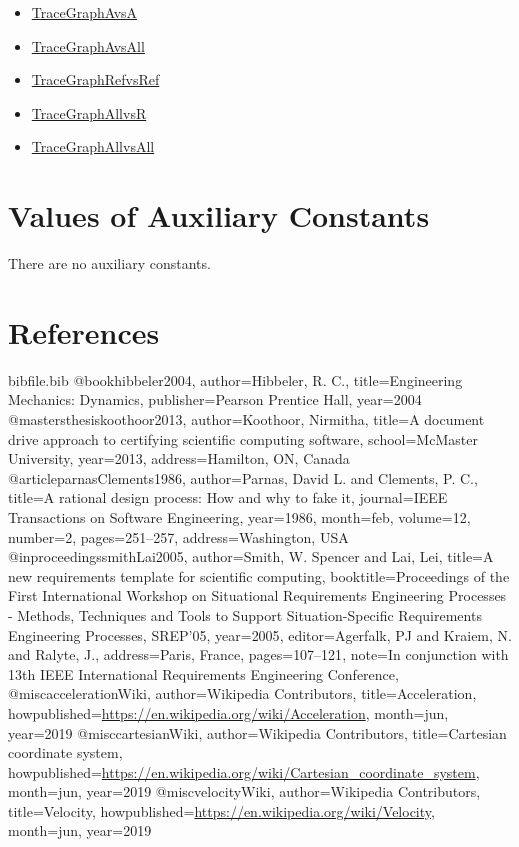 \documentclass[12pt]{article}
\begin{document}
\begin{itemize}
\item{\hyperref{../../../traceygraphs/SglPendulum/avsa.svg}{}{}{TraceGraphAvsA}}
\item{\hyperref{../../../traceygraphs/SglPendulum/avsall.svg}{}{}{TraceGraphAvsAll}}
\item{\hyperref{../../../traceygraphs/SglPendulum/refvsref.svg}{}{}{TraceGraphRefvsRef}}
\item{\hyperref{../../../traceygraphs/SglPendulum/allvsr.svg}{}{}{TraceGraphAllvsR}}
\item{\hyperref{../../../traceygraphs/SglPendulum/allvsall.svg}{}{}{TraceGraphAllvsAll}}
\end{itemize}
\section{Values of Auxiliary Constants}
\label{Sec:AuxConstants}
There are no auxiliary constants.

\section{References}
\label{Sec:References}
\begin{filecontents*}{bibfile.bib}
@book{hibbeler2004,
author={Hibbeler, R. C.},
title={Engineering Mechanics: Dynamics},
publisher={Pearson Prentice Hall},
year={2004}}
@mastersthesis{koothoor2013,
author={Koothoor, Nirmitha},
title={A document drive approach to certifying scientific computing software},
school={McMaster University},
year={2013},
address={Hamilton, ON, Canada}}
@article{parnasClements1986,
author={Parnas, David L. and Clements, P. C.},
title={A rational design process: How and why to fake it},
journal={IEEE Transactions on Software Engineering},
year={1986},
month=feb,
volume={12},
number={2},
pages={251--257},
address={Washington, USA}}
@inproceedings{smithLai2005,
author={Smith, W. Spencer and Lai, Lei},
title={A new requirements template for scientific computing},
booktitle={Proceedings of the First International Workshop on Situational Requirements Engineering Processes - Methods, Techniques and Tools to Support Situation-Specific Requirements Engineering Processes, SREP'05},
year={2005},
editor={Agerfalk, PJ and Kraiem, N. and Ralyte, J.},
address={Paris, France},
pages={107--121},
note={In conjunction with 13th IEEE International Requirements Engineering Conference,}}
@misc{accelerationWiki,
author={Wikipedia Contributors},
title={Acceleration},
howpublished={\url{https://en.wikipedia.org/wiki/Acceleration}},
month=jun,
year={2019}}
@misc{cartesianWiki,
author={Wikipedia Contributors},
title={Cartesian coordinate system},
howpublished={\url{https://en.wikipedia.org/wiki/Cartesian\_coordinate\_system}},
month=jun,
year={2019}}
@misc{velocityWiki,
author={Wikipedia Contributors},
title={Velocity},
howpublished={\url{https://en.wikipedia.org/wiki/Velocity}},
month=jun,
year={2019}}
\end{filecontents*}
\nocite{*}
\printbibliography[heading=none]
\end{document}
